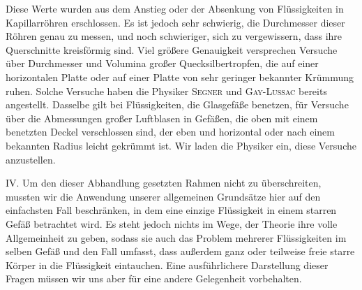 Diese Werte wurden aus dem Anstieg oder der Absenkung von Flüssigkeiten in Kapillarröhren erschlossen. Es ist jedoch sehr schwierig, die Durchmesser dieser Röhren genau zu messen, und noch schwieriger, sich zu vergewissern, dass ihre Querschnitte kreisförmig sind. Viel größere Genauigkeit versprechen Versuche über Durchmesser und Volumina großer Quecksilbertropfen, die auf einer horizontalen Platte oder auf einer Platte von sehr geringer bekannter Krümmung ruhen. Solche Versuche haben die Physiker \textsc{Segner} und \textsc{Gay-Lussac} bereits angestellt. Dasselbe gilt bei Flüssigkeiten, die Glasgefäße benetzen, für Versuche über die Abmessungen großer Luftblasen in Gefäßen, die oben mit einem benetzten Deckel verschlossen sind, der eben und horizontal oder nach einem bekannten Radius leicht gekrümmt ist. Wir laden die Physiker ein, diese Versuche anzustellen.

IV. Um den dieser Abhandlung gesetzten Rahmen nicht zu überschreiten, mussten wir die Anwendung unserer allgemeinen Grundsätze hier auf den einfachsten Fall beschränken, in dem eine einzige Flüssigkeit in einem starren Gefäß betrachtet wird. Es steht jedoch nichts im Wege, der Theorie ihre volle Allgemeinheit zu geben, sodass sie auch das Problem mehrerer Flüssigkeiten im selben Gefäß und den Fall umfasst, dass außerdem ganz oder teilweise freie starre Körper in die Flüssigkeit eintauchen. Eine ausführlichere Darstellung dieser Fragen müssen wir uns aber für eine andere Gelegenheit vorbehalten.
